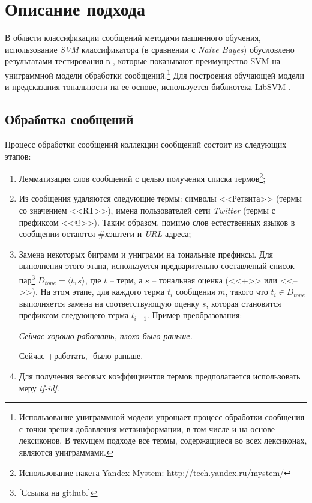 \section{Описание подхода}
    \label{sec:buildingApproachDescription}
    В области классификации сообщений методами машинного обучения, использование
    {\it SVM} классификатора (в сравнении с {\it Naive Bayes}) обусловлено результатами
    тестирования в \cite{svmAdvantages}, которые показывают преимущество SVM на униграммной
    модели обработки сообщений.\footnote{
        Использование униграммной модели упрощает процесс обработки сообщения с
        точки зрения добавления метаинформации, в том числе и на основе лексиконов.
        В текущем подходе все термы, содержащиеся во всех лексиконах, являются
        униграммами.
    }
    Для построения обучающей модели и предсказания
    тональности на ее основе, используется библиотека LibSVM \cite{svmClassifier}.

    \subsection{Обработка сообщений}
    \label{sec:buildingMsgProcessing}
    Процесс обработки сообщений коллекции сообщений состоит из следующих этапов:
    \begin{enumerate}
        \item Лемматизация слов сообщений с целью получения списка термов\footnote{
            Использование пакета Yandex Mystem:
            \url{http://tech.yandex.ru/mystem/}
        };

        \item Из сообщения удаляются следующие термы:
            символы <<Ретвита>> (термы со значением <<RT>>),
            имена пользователей сети {\it Twitter} (термы с префиксом <<@>>).
            Таким образом, помимо слов естественных языков в сообщении остаются
            \#хэштеги и {\it URL\hspace{1pt}}-адреса;
        \item Замена некоторых биграмм и униграмм на тональные префиксы.
            Для выполнения этого этапа, используется предварительно составленый
            список пар\footnote{
                [Ссылка на github.]
            }
            $D_{tone} = {\langle t, s\rangle}$, где $t$ -- терм, а $s$ --
            тональная оценка (<<+>> или <<-->>). На этом этапе, для каждого терма $t_i$
            сообщения $m$, такого что $t_i \in D_{tone}$ выполняется замена на соответствующую
            оценку $s$, которая становится префиксом следующего терма $t_{i+1}$.
            Пример преобразования:
            \begin{center}
                \it
                Сейчас \underline{хорошо} работать, \underline{плохо} было раньше.

                Сейчас +работать, -было раньше.
            \end{center}
        \item Для получения весовых коэффициентов термов предполагается
            использовать меру {\it tf-idf}.
    \end{enumerate}

